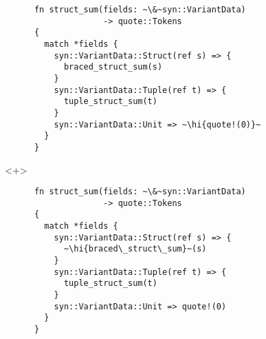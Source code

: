 \documentclass[usepdftitle=false]{beamer}
\renewcommand{\&}{\makebox[\widthof{\ampersand}][c]{\scalebox{0.9}[1.0]{\Book\ampersand}}}
\newcommand{\+}{\makebox[\widthof{+}][c]{\raisebox{-.2\height}{\scalefont{1.5}\Light+}}}
\newcommand{\hi}[1]{%
\tikz[baseline=(A.base)]
 \node[highlighting=0,inner sep=0pt,text depth=0pt] (A) {#1};%
}
\begin{document}
\begin{frame}[fragile]
\begin{onlyenv}
\begin{verbatim}
      fn struct_sum(fields: ~\&~syn::VariantData)
                    -> quote::Tokens
      {
        match *fields {
          syn::VariantData::Struct(ref s) => {
            braced_struct_sum(s)
          }
          syn::VariantData::Tuple(ref t) => {
            tuple_struct_sum(t)
          }
          syn::VariantData::Unit => ~\hi{quote!(0)}~
        }
      }
    \end{verbatim}
  \end{onlyenv}
  \begin{onlyenv}<+>
    \begin{verbatim}
      fn struct_sum(fields: ~\&~syn::VariantData)
                    -> quote::Tokens
      {
        match *fields {
          syn::VariantData::Struct(ref s) => {
            ~\hi{braced\_struct\_sum}~(s)
          }
          syn::VariantData::Tuple(ref t) => {
            tuple_struct_sum(t)
          }
          syn::VariantData::Unit => quote!(0)
        }
      }
    \end{verbatim}
  \end{onlyenv}
\end{frame}
\end{document}
